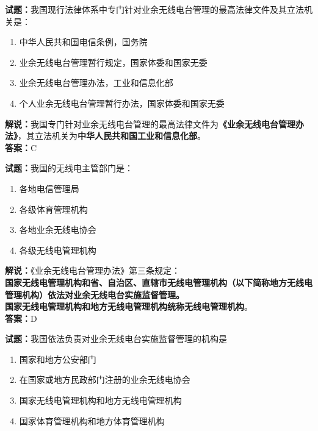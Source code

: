 \documentclass{ctexbook}
\begin{document}
\noindent\textbf{试题：}我国现行法律体系中专门针对业余无线电台管理的最高法律文件及其立法机关是：

\begin{enumerate}[leftmargin=3em]
  \item 中华人民共和国电信条例，国务院
  \item 业余无线电台管理暂行规定，国家体委和国家无委
  \item 业余无线电台管理办法，工业和信息化部
  \item 个人业余无线电台管理暂行办法，国家体委和国家无委
\end{enumerate}

\noindent\textbf{解说：}我国专门针对业余无线电台管理的最高法律文件为\textbf{《业余无线电台管理办法》}，其立法机关为\textbf{中华人民共和国工业和信息化部}。\\\noindent\textbf{答案：}C

\vspace{\baselineskip}

\noindent\textbf{试题：}我国的无线电主管部门是：

\begin{enumerate}[leftmargin=3em]
  \item 各地电信管理局
  \item 各级体育管理机构
  \item 各地业余无线电协会
  \item 各级无线电管理机构
\end{enumerate}
\noindent\textbf{解说：}《业余无线电台管理办法》第三条规定：\\\textbf{国家无线电管理机构和省、自治区、直辖市无线电管理机构（以下简称地方无线电管理机构）依法对业余无线电台实施监督管理。\\
  国家无线电管理机构和地方无线电管理机构统称无线电管理机构}。\\\noindent\textbf{答案：}D

\vspace{\baselineskip}

\noindent\textbf{试题：}我国依法负责对业余无线电台实施监督管理的机构是

\begin{enumerate}[leftmargin=3em]
  \item 国家和地方公安部门
  \item 在国家或地方民政部门注册的业余无线电协会
  \item 国家无线电管理机构和地方无线电管理机构
  \item 国家体育管理机构和地方体育管理机构
\end{enumerate}
\end{document}
